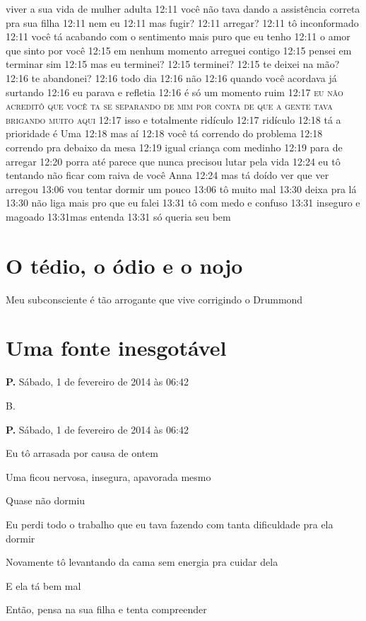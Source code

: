 viver a sua vida de mulher adulta 12:11 você não tava dando a
assistência correta pra sua filha 12:11 nem eu 12:11 mas fugir? 12:11
arregar? 12:11 tô inconformado 12:11 você tá acabando com o sentimento
mais puro que eu tenho 12:11 o amor que sinto por você 12:15 em nenhum
momento arreguei contigo 12:15 pensei em terminar sim 12:15 mas eu
terminei? 12:15 terminei? 12:15 te deixei na mão? 12:16 te abandonei?
12:16 todo dia 12:16 não 12:16 quando você acordava já surtando 12:16 eu
parava e refletia 12:16 é só um momento ruim 12:17 \textsc{eu não acreditô que
você ta se separando de mim por conta de que a gente tava brigando muito
aqui} 12:17 isso e totalmente ridículo 12:17 ridículo 12:18 tá a
prioridade é Uma 12:18 mas aí 12:18 você tá correndo do problema 12:18
correndo pra debaixo da mesa 12:19 igual criança com medinho 12:19 para
de arregar 12:20 porra até parece que nunca precisou lutar pela vida
12:24 eu tô tentando não ficar com raiva de você Anna 12:24 mas tá doído
ver que ver arregou 13:06 vou tentar dormir um pouco 13:06 tô muito mal
13:30 deixa pra lá 13:30 não liga mais pro que eu falei 13:31 tô com
medo e confuso 13:31 inseguro e magoado 13:31mas entenda 13:31 só queria
seu bem

\chapter{O tédio, o ódio e o nojo}

Meu subconsciente é tão arrogante que vive corrigindo o Drummond

\chapter{Uma fonte inesgotável}

\textbf{P.} Sábado, 1 de fevereiro de 2014 às 06:42

B.

\textbf{P.} Sábado, 1 de fevereiro de 2014 às 06:42

Eu tô arrasada por causa de ontem

Uma ficou nervosa, insegura, apavorada mesmo

Quase não dormiu

Eu perdi todo o trabalho que eu tava fazendo com tanta dificuldade pra
ela dormir

Novamente tô levantando da cama sem energia pra cuidar dela

E ela tá bem mal

Então, pensa na sua filha e tenta compreender

